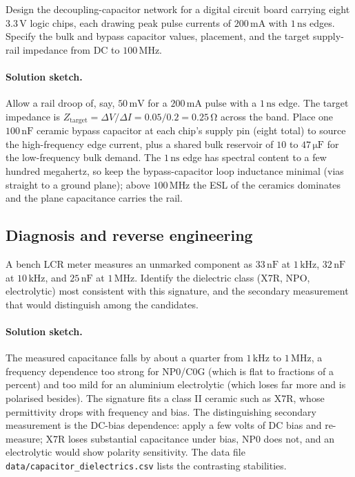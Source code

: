 \begin{exercise}
Design the decoupling-capacitor network for a digital circuit board
carrying eight $3.3\,\si{\volt}$ logic chips, each drawing peak pulse
currents of $200\,\si{\milli\ampere}$ with $1\,\si{\nano\second}$
edges. Specify the bulk and bypass capacitor values, placement, and
the target supply-rail impedance from DC to $100\,\si{\mega\hertz}$.
\paragraph{Solution sketch.}
Allow a rail droop of, say, $50\,\si{\milli\volt}$ for a
$200\,\si{\milli\ampere}$ pulse with a $1\,\si{\nano\second}$ edge. The
target impedance is $Z_{\text{target}} = \Delta V/\Delta I =
0.05/0.2 = 0.25\,\si{\ohm}$ across the band. Place one
$100\,\si{\nano\farad}$ ceramic bypass capacitor at each chip's supply
pin (eight total) to source the high-frequency edge current, plus a
shared bulk reservoir of $10$ to $47\,\si{\micro\farad}$ for the
low-frequency bulk demand. The $1\,\si{\nano\second}$ edge has spectral
content to a few hundred megahertz, so keep the bypass-capacitor loop
inductance minimal (vias straight to a ground plane); above
$100\,\si{\mega\hertz}$ the ESL of the ceramics dominates and the plane
capacitance carries the rail.
\end{exercise}

\subsection*{Diagnosis and reverse engineering}

\begin{exercise}
A bench LCR meter measures an unmarked component as $33\,\si{\nano
\farad}$ at $1\,\si{\kilo\hertz}$, $32\,\si{\nano\farad}$ at $10\,\si{
\kilo\hertz}$, and $25\,\si{\nano\farad}$ at $1\,\si{\mega\hertz}$.
Identify the dielectric class (X7R, NPO, electrolytic) most consistent
with this signature, and the secondary measurement that would
distinguish among the candidates.
\paragraph{Solution sketch.}
The measured capacitance falls by about a quarter from
$1\,\si{\kilo\hertz}$ to $1\,\si{\mega\hertz}$, a frequency dependence
too strong for NP0/C0G (which is flat to fractions of a percent) and
too mild for an aluminium electrolytic (which loses far more and is
polarised besides). The signature fits a class II ceramic such as X7R,
whose permittivity drops with frequency and bias. The distinguishing
secondary measurement is the DC-bias dependence: apply a few volts of
DC bias and re-measure; X7R loses substantial capacitance under bias,
NP0 does not, and an electrolytic would show polarity sensitivity. The
data file \texttt{data/capacitor\_dielectrics.csv} lists the
contrasting stabilities.
\end{exercise}


